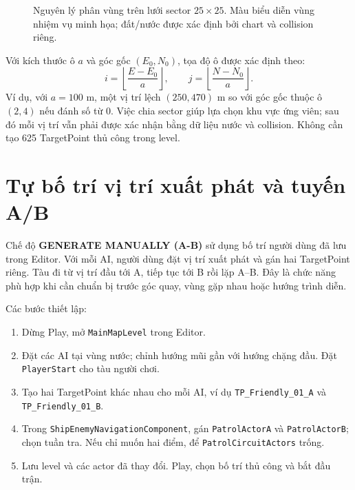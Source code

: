 \documentclass[11pt,a4paper,oneside]{report}
\begin{document}
\begin{figure}[H]\centering
{}
\caption{Nguyên lý phân vùng trên lưới sector $25\times25$. Màu biểu diễn vùng nhiệm vụ minh họa; đất/nước được xác định bởi chart và collision riêng.}\label{fig:sector}
\end{figure}

Với kích thước ô $a$ và góc gốc $(E_0,N_0)$, tọa độ ô được xác định theo:
\begin{equation}
 i=\left\lfloor\frac{E-E_0}{a}\right\rfloor,\qquad
 j=\left\lfloor\frac{N-N_0}{a}\right\rfloor.
\end{equation}
Ví dụ, với $a=100$ m, một vị trí lệch $(250,470)$ m so với góc gốc thuộc ô $(2,4)$ nếu đánh số từ 0. Việc chia sector giúp lựa chọn khu vực ứng viên; sau đó mỗi vị trí vẫn phải được xác nhận bằng dữ liệu nước và collision. Không cần tạo 625 TargetPoint thủ công trong level.

\section{Tự bố trí vị trí xuất phát và tuyến A/B}
Chế độ \textbf{GENERATE MANUALLY (A-B)} sử dụng bố trí người dùng đã lưu trong Editor. Với mỗi AI, người dùng đặt vị trí xuất phát và gán hai TargetPoint riêng. Tàu đi từ vị trí đầu tới A, tiếp tục tới B rồi lặp A--B. Đây là chức năng phù hợp khi cần chuẩn bị trước góc quay, vùng gặp nhau hoặc hướng trình diễn.

\begin{samepage}
Các bước thiết lập:
\begin{enumerate}
\item Dừng Play, mở \texttt{MainMapLevel} trong Editor.
\item Đặt các AI tại vùng nước; chỉnh hướng mũi gần với hướng chặng đầu. Đặt \texttt{PlayerStart} cho tàu người chơi.
\item Tạo hai TargetPoint khác nhau cho mỗi AI, ví dụ \texttt{TP\_Friendly\_01\_A} và \texttt{TP\_Friendly\_01\_B}.
\item Trong \texttt{ShipEnemyNavigationComponent}, gán \texttt{PatrolActorA} và \texttt{PatrolActorB}; chọn tuần tra. Nếu chỉ muốn hai điểm, để \texttt{PatrolCircuitActors} trống.
\item Lưu level và các actor đã thay đổi. Play, chọn bố trí thủ công và bắt đầu trận.
\end{enumerate}\end{samepage}
\end{document}
